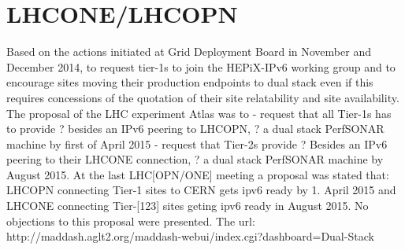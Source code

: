 \section{LHCONE/LHCOPN}
Based on the actions initiated at Grid Deployment Board in November and December 2014, to request tier-1s to join the HEPiX-IPv6 working group and to encourage sites moving their production endpoints to dual stack even if this requires concessions of the quotation of their site relatability and site availability. The proposal of the LHC experiment Atlas was to
	- request that all Tier-1s has to provide 
		? besides an IPv6 peering to LHCOPN,
		? a dual stack PerfSONAR machine by first of April 2015
	- request that Tier-2s provide 
		? Besides an IPv6 peering to their LHCONE connection,
		? a dual stack PerfSONAR machine by August 2015.
At the last LHC[OPN/ONE] meeting a proposal was stated that:
LHCOPN connecting Tier-1 sites to CERN gets ipv6 ready by 1. April 2015 and
LHCONE connecting Tier-[123] sites geting ipv6 ready in August 2015.
No objections to this proposal were presented. The url: http://maddash.aglt2.org/maddash-webui/index.cgi?dashboard=Dual-Stack%